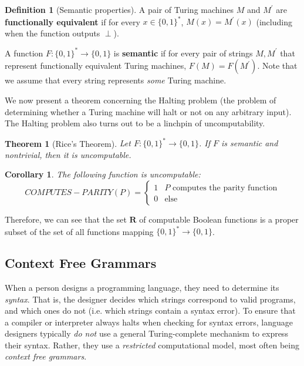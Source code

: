\documentclass[a4paper, 12pt]{report}
\newtheorem{theorem}{Theorem}[section]
\newtheorem{corollary}{Corollary}[theorem]
\theoremstyle{remark}
\theoremstyle{definition}
\newtheorem{definition}{Definition}[section]
\begin{document}
\begin{definition}[Semantic properties]
A pair of Turing machines $M$ and $M^\prime$ are \textbf{functionally equivalent} if for every $x \in \{0,1\}^*$, $M(x) = M^\prime (x)$ (including when the function outputs $\perp$). 

A function $F: \{0,1\}^* \longrightarrow \{0,1\}$ is \textbf{semantic} if for every pair of strings $M, M^\prime$ that represent functionally equivalent Turing machines, $F(M) = F(M^\prime)$. Note that we assume that every string represents \textit{some} Turing machine. 
\end{definition}

We now present a theorem concerning the Halting problem (the problem of determining whether a Turing machine will halt or not on any arbitrary input). The Halting problem also turns out to be a linchpin of uncomputability. 

\begin{theorem}[Rice's Theorem]
Let $F: \{0,1\}^* \longrightarrow \{0,1\}$. If $F$ is semantic and nontrivial, then it is uncomputable. 
\end{theorem}

\begin{corollary}
The following function is uncomputable: 
\[COMPUTES-PARITY(P) = \begin{cases}1 & P \text{ computes the parity function} \\
0 & \text{else}
\end{cases}\]
\end{corollary}

Therefore, we can see that the set $\mathbf{R}$ of computable Boolean functions is a proper subset of the set of all functions mapping $\{0, 1\}^* \longrightarrow \{0, 1\}$. 

\subsection{Context Free Grammars}
When a person designs a programming language, they need to determine its \textit{syntax}. That is, the designer decides which strings correspond to valid programs, and which ones do not (i.e. which strings contain a syntax error). To ensure that a compiler or interpreter always halts when checking for syntax errors, language designers typically \textit{do not} use a general Turing-complete mechanism to express their syntax. Rather, they use a \textit{restricted} computational model, most often being \textit{context free grammars}. 
\end{document}

